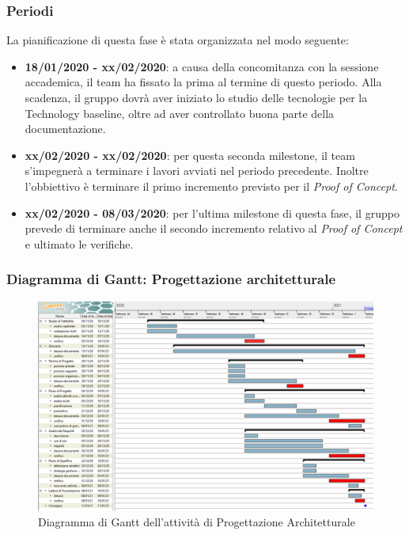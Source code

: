 \subsubsection{Periodi}
La pianificazione di questa fase è stata organizzata nel modo seguente:
\begin{itemize}
\item \textbf{18/01/2020 - xx/02/2020}: a causa della concomitanza con la sessione accademica, il team ha fissato la prima  al termine di questo periodo. Alla scadenza, il gruppo dovrà aver iniziato lo studio delle tecnologie per la Technology baseline, oltre ad aver controllato buona parte della documentazione.

\item \textbf{xx/02/2020 - xx/02/2020}: per questa seconda milestone, il team s'impegnerà a terminare i lavori avviati nel periodo precedente. Inoltre l'obbiettivo è terminare il primo incremento previsto per il \textit{Proof of Concept}.

\item \textbf{xx/02/2020 - 08/03/2020}: per l'ultima milestone di questa fase, il gruppo prevede di terminare anche il secondo incremento relativo al \textit{Proof of Concept} e ultimato le verifiche.
\end{itemize}

\subsubsection{Diagramma di Gantt: Progettazione architetturale}
\begin{figure}[h]
	\includegraphics[scale=0.45]{img/gant-analisi.PNG}
	\caption{Diagramma di Gantt dell'attività di Progettazione Architetturale}
\end{figure}